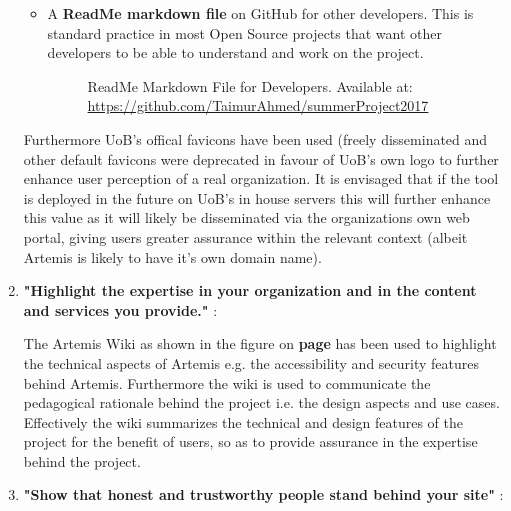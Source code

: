 \begin{enumerate}
\begin{itemize}
        \item A \textbf{ReadMe markdown file} on GitHub for other developers. This is standard practice in most Open Source projects that want other developers to be able to understand and work on the project.
            \begin{figure}[H]
                \caption{ReadMe Markdown File for Developers. Available at: \url{https://github.com/TaimurAhmed/summerProject2017}}
            \end{figure}
    \end{itemize}
    
    Furthermore UoB's offical favicons have been used (freely disseminated \cite{UniversityofBristola} and other default favicons were deprecated in favour of UoB's own logo \cite{UniversityofBristola} to further enhance user perception of a real organization. It is envisaged that if the tool is deployed in the future on UoB's in house servers this will further enhance this value as it will likely be disseminated via the organizations own web portal, giving users greater assurance within the relevant context (albeit Artemis is likely to have it's own domain name).


    \newpage    
    \item \textbf{"Highlight the expertise in your organization and in the content and services you provide."} \cite{Fogg2002a}:
    
   
   The Artemis Wiki as shown in the figure on \textbf{page \pageref{wiki}} has been used to highlight the technical aspects of Artemis e.g. the accessibility and security features behind Artemis. Furthermore the wiki is used to communicate the pedagogical rationale behind the project i.e. the design aspects and use cases. Effectively the wiki summarizes the technical and design features of the project for the benefit of users, so as to provide assurance in the expertise behind the project.
   
    \item \textbf{"Show that honest and trustworthy people stand behind your site"} \cite{Fogg2002a}:
    

\end{enumerate}

